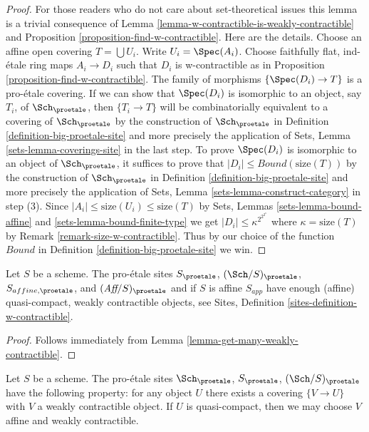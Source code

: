 \begin{proof}
For those readers who do not care about set-theoretical issues
this lemma is a trivial consequence of
Lemma \ref{lemma-w-contractible-is-weakly-contractible} and
Proposition \ref{proposition-find-w-contractible}.
Here are the details.
Choose an affine open covering $T = \bigcup U_i$. Write $U_i = \Spec(A_i)$.
Choose faithfully flat, ind-\'etale ring maps $A_i \to D_i$
such that $D_i$ is w-contractible as in
Proposition \ref{proposition-find-w-contractible}.
The family of morphisms $\{\Spec(D_i) \to T\}$ is a
pro-\'etale covering.
If we can show that $\Spec(D_i)$ is isomorphic to an object, say $T_i$,
of $\Sch_\proetale$, then $\{T_i \to T\}$ will be combinatorially
equivalent to a covering of $\Sch_\proetale$ by the construction
of $\Sch_\proetale$ in Definition \ref{definition-big-proetale-site}
and more precisely the application of
Sets, Lemma \ref{sets-lemma-coverings-site} in the last step.
To prove $\Spec(D_i)$ is isomorphic to an object of
$\Sch_\proetale$, it suffices to prove that
$|D_i| \leq Bound(\text{size}(T))$ by the construction
of $\Sch_\proetale$ in Definition \ref{definition-big-proetale-site}
and more precisely the application of
Sets, Lemma \ref{sets-lemma-construct-category} in step (3).
Since $|A_i| \leq \text{size}(U_i) \leq \text{size}(T)$
by Sets, Lemmas \ref{sets-lemma-bound-affine} and
\ref{sets-lemma-bound-finite-type} we get
$|D_i| \leq \kappa^{2^{2^{2^\kappa}}}$ where $\kappa = \text{size}(T)$
by Remark \ref{remark-size-w-contractible}.
Thus by our choice of the function $Bound$ in
Definition \ref{definition-big-proetale-site} we win.
\end{proof}

\begin{lemma}
\label{lemma-proetale-enough-w-contractible}
Let $S$ be a scheme. The pro-\'etale sites
$S_\proetale$, $(\Sch/S)_\proetale$, $S_{affine, \proetale}$, and
$(\textit{Aff}/S)_\proetale$ and if $S$ is affine $S_{app}$
have enough (affine) quasi-compact, weakly contractible
objects, see Sites, Definition \ref{sites-definition-w-contractible}.
\end{lemma}

\begin{proof}
Follows immediately from Lemma \ref{lemma-get-many-weakly-contractible}.
\end{proof}

\begin{lemma}
\label{lemma-weakly-contractible-cover}
Let $S$ be a scheme. The pro-\'etale sites
$\Sch_\proetale$, $S_\proetale$, $(\Sch/S)_\proetale$
have the following property: for any object
$U$ there exists a covering $\{V \to U\}$ with $V$ a
weakly contractible object. If $U$ is quasi-compact, then we
may choose $V$ affine and weakly contractible.
\end{lemma}

